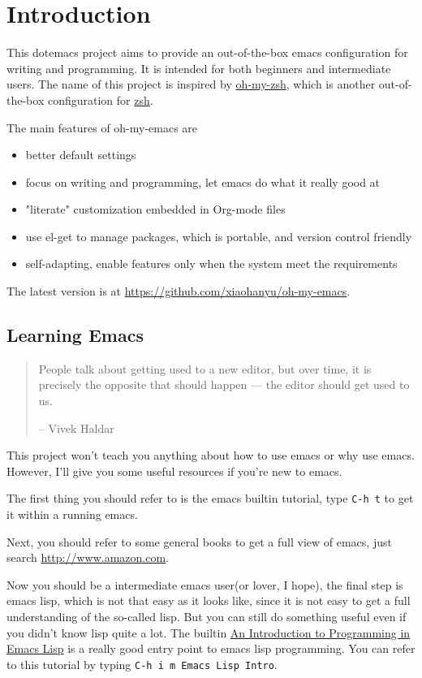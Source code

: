 \documentclass[11pt]{article}
\begin{document}
\section*{Introduction}
\label{sec-2}
This dotemacs project aims to provide an out-of-the-box emacs configuration
for writing and programming. It is intended for both beginners and
intermediate users. The name of this project is inspired by \href{https://github.com/robbyrussell/oh-my-zsh}{oh-my-zsh}, which is
another out-of-the-box configuration for \href{http://www.zsh.org/}{zsh}.

The main features of oh-my-emacs are
\begin{itemize}
\item better default settings
\item focus on writing and programming, let emacs do what it really good at
\item "literate" customization embedded in Org-mode files
\item use el-get to manage packages, which is portable, and version control
friendly
\item self-adapting, enable features only when the system meet the requirements
\end{itemize}

The latest version is at \url{https://github.com/xiaohanyu/oh-my-emacs}.

\subsection*{Learning Emacs}
\label{sec-2-1}
\begin{quote}
People talk about getting used to a new editor, but over time, it is precisely
the opposite that should happen --- the editor should get used to us.

-- Vivek Haldar
\end{quote}

This project won't teach you anything about how to use emacs or why use
emacs. However, I'll give you some useful resources if you're new to emacs.

The first thing you should refer to is the emacs builtin tutorial, type \texttt{C-h
t} to get it within a running emacs.

Next, you should refer to some general books to get a full view of emacs,
just search \url{http://www.amazon.com}.

Now you should be a intermediate emacs user(or lover, I hope), the final step
is emacs lisp, which is not that easy as it looks like, since it is not easy to
get a full understanding of the so-called lisp. But you can still do something
useful even if you didn't know lisp quite a lot. The builtin \href{https://www.gnu.org/software/emacs/manual/html_node/eintr/}{An Introduction to
Programming in Emacs Lisp} is a really good entry point to emacs lisp
programming. You can refer to this tutorial by typing \texttt{C-h i m Emacs Lisp
Intro}.
\end{document}
